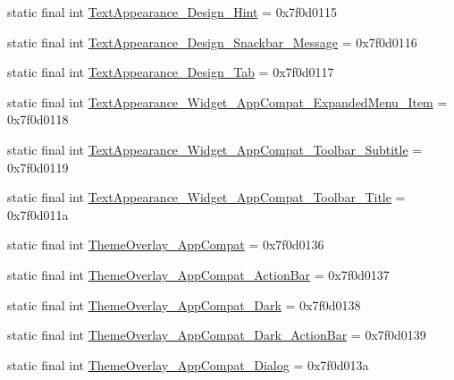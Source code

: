 \begin{DoxyCompactItemize}
\item 
static final int \mbox{\hyperlink{classandroid_1_1support_1_1design_1_1R_1_1style_a2b8b92db31ec208aacc3f0d62cedec8b}{Text\+Appearance\+\_\+\+Design\+\_\+\+Hint}} = 0x7f0d0115
\item 
static final int \mbox{\hyperlink{classandroid_1_1support_1_1design_1_1R_1_1style_ac85d0ef831a6f8f8ea0ff291900abc78}{Text\+Appearance\+\_\+\+Design\+\_\+\+Snackbar\+\_\+\+Message}} = 0x7f0d0116
\item 
static final int \mbox{\hyperlink{classandroid_1_1support_1_1design_1_1R_1_1style_ae7a00e72875b359ac34740afb028c67d}{Text\+Appearance\+\_\+\+Design\+\_\+\+Tab}} = 0x7f0d0117
\item 
static final int \mbox{\hyperlink{classandroid_1_1support_1_1design_1_1R_1_1style_a3d3c649896fe547217bf1e3a5f7c2c2e}{Text\+Appearance\+\_\+\+Widget\+\_\+\+App\+Compat\+\_\+\+Expanded\+Menu\+\_\+\+Item}} = 0x7f0d0118
\item 
static final int \mbox{\hyperlink{classandroid_1_1support_1_1design_1_1R_1_1style_ab87eda6737968b821619555803a66662}{Text\+Appearance\+\_\+\+Widget\+\_\+\+App\+Compat\+\_\+\+Toolbar\+\_\+\+Subtitle}} = 0x7f0d0119
\item 
static final int \mbox{\hyperlink{classandroid_1_1support_1_1design_1_1R_1_1style_ad45bedf9c7a7f9f80fc30792d23c9998}{Text\+Appearance\+\_\+\+Widget\+\_\+\+App\+Compat\+\_\+\+Toolbar\+\_\+\+Title}} = 0x7f0d011a
\item 
static final int \mbox{\hyperlink{classandroid_1_1support_1_1design_1_1R_1_1style_ae88528ab7b6fb65a2a96bef866a513ea}{Theme\+Overlay\+\_\+\+App\+Compat}} = 0x7f0d0136
\item 
static final int \mbox{\hyperlink{classandroid_1_1support_1_1design_1_1R_1_1style_ab6f6f318923271179ec1e4216744016d}{Theme\+Overlay\+\_\+\+App\+Compat\+\_\+\+Action\+Bar}} = 0x7f0d0137
\item 
static final int \mbox{\hyperlink{classandroid_1_1support_1_1design_1_1R_1_1style_a66d45e018d9ab21755dd3dfe91aa7f0a}{Theme\+Overlay\+\_\+\+App\+Compat\+\_\+\+Dark}} = 0x7f0d0138
\item 
static final int \mbox{\hyperlink{classandroid_1_1support_1_1design_1_1R_1_1style_aa195b492725c39a7a365b9270076be81}{Theme\+Overlay\+\_\+\+App\+Compat\+\_\+\+Dark\+\_\+\+Action\+Bar}} = 0x7f0d0139
\item 
static final int \mbox{\hyperlink{classandroid_1_1support_1_1design_1_1R_1_1style_a4ff8165e69361614a7b6f17506bebed2}{Theme\+Overlay\+\_\+\+App\+Compat\+\_\+\+Dialog}} = 0x7f0d013a

\end{DoxyCompactItemize}
